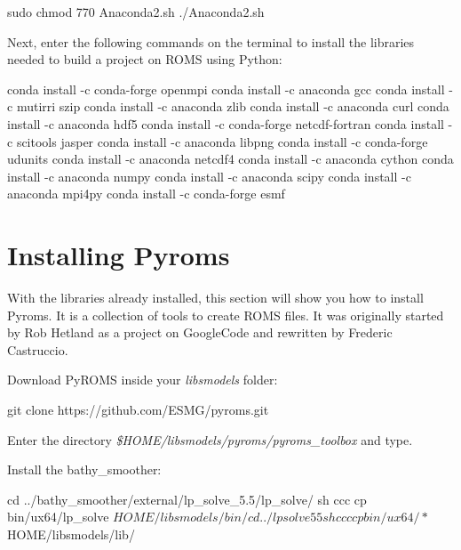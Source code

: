 \begin{bashcode}
 sudo chmod 770 Anaconda2.sh
 ./Anaconda2.sh
\end{bashcode}
\bigskip

\noindent Next, enter the following commands on the terminal to install the libraries needed to build a project on ROMS using Python:
\bigskip

\begin{bashcode}
conda install -c conda-forge openmpi
conda install -c anaconda gcc
conda install -c mutirri szip
conda install -c anaconda zlib
conda install -c anaconda curl
conda install -c anaconda hdf5
conda install -c conda-forge netcdf-fortran
conda install -c scitools jasper
conda install -c anaconda libpng
conda install -c conda-forge udunits
conda install -c anaconda netcdf4
conda install -c anaconda cython
conda install -c anaconda numpy
conda install -c anaconda scipy
conda install -c anaconda mpi4py
conda install -c conda-forge esmf
\end{bashcode}
\bigskip

\section{Installing Pyroms}
\bigskip

\noindent With the libraries already installed, this section will show you how to install Pyroms. 
It is a collection of tools to create ROMS files. It was originally started by Rob Hetland as a project on GoogleCode and 
rewritten by Frederic Castruccio.
\bigskip

\noindent Download PyROMS inside your \textit{libsmodels} folder:
\bigskip

\begin{bashcode}
git clone https://github.com/ESMG/pyroms.git
\end{bashcode}
\bigskip

\noindent Enter the directory \textit{\$HOME/libsmodels/pyroms/pyroms\_toolbox} and type.
\bigskip

\bigskip

\noindent Install the bathy\_smoother:
\bigskip

\begin{bashcode}
cd ../bathy_smoother/external/lp_solve_5.5/lp_solve/
sh ccc
cp bin/ux64/lp_solve $HOME/libsmodels/bin/
cd ../lpsolve55
sh ccc
cp bin/ux64/* $HOME/libsmodels/lib/
\end{bashcode}
\bigskip

